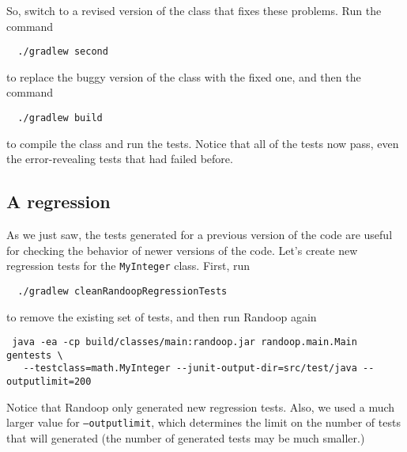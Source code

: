 \documentclass[11pt, oneside]{article} %
\newcommand{\code}[1]{{\texttt{#1}}}
\newcommand{\cmd}[1]{{\texttt{#1}}}
\begin{document}
So, switch to a revised version of the class that fixes these problems.
Run the command
\begin{verbatim}
  ./gradlew second
\end{verbatim}
to replace the buggy version of the class with the fixed one, and then the command
\begin{verbatim}
  ./gradlew build
\end{verbatim}
to compile the class and run the tests. 
Notice that all of the tests now pass, even the error-revealing tests that had failed before.

\subsection{A regression}

As we just saw, the tests generated for a previous version of the code are useful for checking the behavior of newer versions of the code.
Let's create new regression tests for the \code{MyInteger} class.
First, run
\begin{verbatim}
  ./gradlew cleanRandoopRegressionTests
\end{verbatim}
to remove the existing set of tests, and then run Randoop again
\begin{verbatim}
 java -ea -cp build/classes/main:randoop.jar randoop.main.Main gentests \
   --testclass=math.MyInteger --junit-output-dir=src/test/java --outputlimit=200
\end{verbatim}
Notice that Randoop only generated new regression tests.
Also, we used a much larger value for \cmd{--outputlimit}, which determines the limit on the number of tests that will generated (the number of generated tests may be much smaller.)
\end{document}

